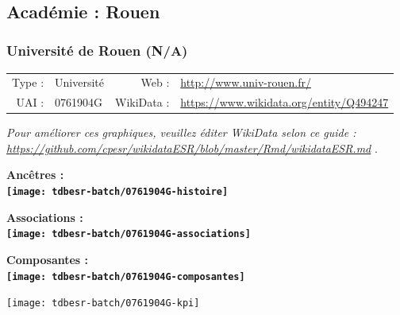 \documentclass[12pt,french,]{article}
\begin{document}
\ifoddpage \fi ~\newpage  

\hypertarget{acaduxe9mie-rouen}{%
\subsection{Académie : Rouen}\label{acaduxe9mie-rouen}}

\hypertarget{universituxe9-de-rouen-na}{%
\subsubsection{Université de Rouen
(N/A)}\label{universituxe9-de-rouen-na}}

\begin{tabular*}{\textwidth}{rp{5cm}rl}  
\hline  
Type : & Université & Web : &\href{http://www.univ-rouen.fr/}{http://www.univ-rouen.fr/} \\  
UAI : & 0761904G & WikiData : & \href{https://www.wikidata.org/entity/Q494247}{https://www.wikidata.org/entity/Q494247} \\  
\hline  
\end{tabular*}

\textit{\scriptsize Pour améliorer ces graphiques, veuillez éditer WikiData selon ce guide :  \href{https://github.com/cpesr/wikidataESR/blob/master/Rmd/wikidataESR.md}{https://github.com/cpesr/wikidataESR/blob/master/Rmd/wikidataESR.md}}
.

\vspace{1cm}  
\begin{minipage}[b]{0.50\textwidth}\begin{center} \bf Ancêtres : \\  
\texttt{[image: tdbesr-batch/0761904G-histoire]} \end{center}\end{minipage}\begin{minipage}[b]{0.50\textwidth}\begin{center} \bf Associations : \\  
\texttt{[image: tdbesr-batch/0761904G-associations]} \end{center}\end{minipage}

\hrulefill

\begin{center} \bf Composantes : \\  
\texttt{[image: tdbesr-batch/0761904G-composantes]} \end{center}

\begin{center}\texttt{[image: tdbesr-batch/0761904G-kpi]} \end{center}\checkoddpage
\end{document}
